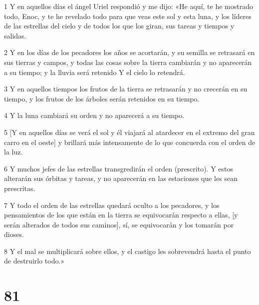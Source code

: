 \par 1 Y en aquellos días el ángel Uriel respondió y me dijo: «He aquí, te he mostrado todo, Enoc, y te he revelado todo para que veas este sol y esta luna, y los líderes de las estrellas del cielo y de todos los que los giran, sus tareas y tiempos y salidas.
\par 2 Y en los días de los pecadores los años se acortarán, y su semilla se retrasará en sus tierras y campos, y todas las cosas sobre la tierra cambiarán y no aparecerán a su tiempo; y la lluvia será retenido Y el cielo lo retendrá.
\par 3 Y en aquellos tiempos los frutos de la tierra se retrasarán y no crecerán en su tiempo, y los frutos de los árboles serán retenidos en su tiempo.
\par 4 Y la luna cambiará su orden y no aparecerá a su tiempo.
\par 5 [Y en aquellos días se verá el sol y él viajará al atardecer en el extremo del gran carro en el oeste] y brillará más intensamente de lo que concuerda con el orden de la luz.
\par 6 Y muchos jefes de las estrellas transgredirán el orden (prescrito). Y estos alterarán sus órbitas y tareas, y no aparecerán en las estaciones que les sean prescritas.
\par 7 Y todo el orden de las estrellas quedará oculto a los pecadores, y los pensamientos de los que están en la tierra se equivocarán respecto a ellas, [y serán alterados de todos sus caminos], sí, se equivocarán y los tomarán por dioses.
\par 8 Y el mal se multiplicará sobre ellos, y el castigo les sobrevendrá hasta el punto de destruirlo todo.»

\chapter{81}

